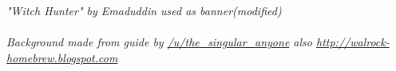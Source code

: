 \documentclass[a4paper]{article}
\begin{document}
\vspace{22pt}
\noindent\textit{"Witch Hunter" by Emaduddin used as banner(modified)}
\\
\\
\textit{Background made from guide by \href{https://www.reddit.com/r/UnearthedArcana/comments/3qb7tp/paladin_oath_of_battle_critique_very_welcome/cwdprpo}{/u/the\_singular\_anyone} also \href{http://walrock-homebrew.blogspot.com}{http://walrock-homebrew.blogspot.com}}	
\end{document}

